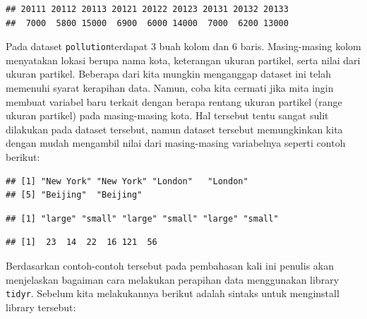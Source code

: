 \documentclass[]{book}
\newenvironment{Shaded}{\begin{snugshade}}{\end{snugshade}}
\newcommand{\OperatorTok}[1]{\textcolor[rgb]{0.81,0.36,0.00}{\textbf{#1}}}
\newcommand{\NormalTok}[1]{#1}
\begin{document}
\begin{verbatim}
## 20111 20112 20113 20121 20122 20123 20131 20132 20133 
##  7000  5800 15000  6900  6000 14000  7000  6200 13000
\end{verbatim}

Pada dataset \texttt{pollution}terdapat 3 buah kolom dan 6 baris.
Masing-masing kolom menyatakan lokasi berupa nama kota, keterangan
ukuran partikel, serta nilai dari ukuran partikel. Beberapa dari kita
mungkin menganggap dataset ini telah memenuhi syarat kerapihan data.
Namun, coba kita cermati jika mita ingin membuat variabel baru terkait
dengan berapa rentang ukuran partikel (range ukuran partikel) pada
masing-masing kota. Hal tersebut tentu sangat sulit dilakukan pada
dataset tersebut, namun dataset tersebut memungkinkan kita dengan mudah
mengambil nilai dari masing-masing variabelnya seperti contoh berikut:

\begin{Shaded}
\end{Shaded}

\begin{verbatim}
## [1] "New York" "New York" "London"   "London"  
## [5] "Beijing"  "Beijing"
\end{verbatim}

\begin{Shaded}
\end{Shaded}

\begin{verbatim}
## [1] "large" "small" "large" "small" "large" "small"
\end{verbatim}

\begin{Shaded}
\end{Shaded}

\begin{verbatim}
## [1]  23  14  22  16 121  56
\end{verbatim}

Berdasarkan contoh-contoh tersebut pada pembahasan kali ini penulis akan
menjelaskan bagaiman cara melakukan perapihan data menggunakan library
\texttt{tidyr}. Sebelum kita melakukannya berikut adalah sintaks untuk
menginstall library tersebut:
\end{document}
